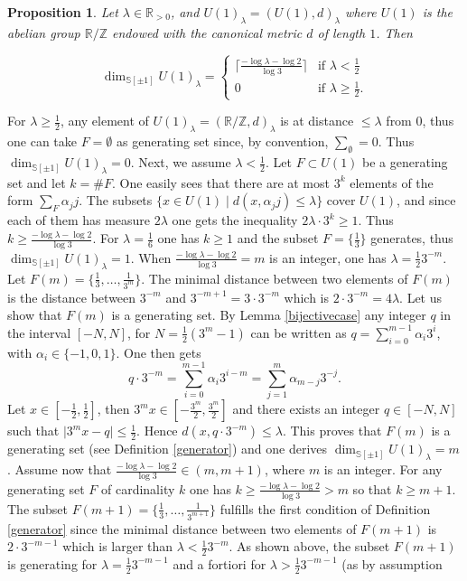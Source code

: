 \documentclass[cupthm]{CUP-JNL-JMJ}
\numberwithin{equation}{section}
\theoremstyle{cupplain}
\newtheorem{proposition}[theorem]{Proposition}
\theoremstyle{cupdefinition}
\theoremstyle{cupremark}
\theoremstyle{cupproof}
\def\R{{\mathbb R}}
\def\S{{\mathbb S}}
\def\Z{{\mathbb Z}}
\def\sss{{\S}}
\def\spm{{\sss[\pm 1]}}
\begin{document}
 
 \begin{proposition}\label{caseh1}
 Let $\lambda\in\R_{>0}$, and  $U(1)_\lambda=(U(1),d)_\lambda$ where $U(1)$ is the abelian group $\R/\Z$ endowed with the canonical metric $d$ of length $1$.	Then 
 
 \begin{equation}\label{dimh1}
\dim_{\spm}U(1)_\lambda=\begin{cases}\bigg\lceil \frac{-\log \lambda- \log 2}{\log 3}\bigg\rceil &\text{if $\lambda< \frac 12$}\\0 &\text{if $\lambda\geq \frac 12$.}	
\end{cases}
\end{equation}
 \end{proposition}
\proof For $\lambda\geq \frac 12$, any element of $U(1)_\lambda=(\R/\Z,d)_\lambda$ is at distance $\leq \lambda$ from $0$, thus one can take $F=\emptyset$ as generating set since, by convention, $\sum_\emptyset=0$. Thus $\dim_{\spm}U(1)_\lambda=0$. Next, we assume $\lambda<\frac 12$. Let $F\subset U(1)$ be a generating set and let $k=\# F$. One easily sees that there are at most $3^k$ elements of the form $\sum_F \alpha_j j$. The subsets  $\{x\in U(1) \mid d(x,\alpha_j j)\leq \lambda\}$  cover $U(1)$, and since each of them has measure $2\lambda$ one gets the inequality $2 \lambda\cdot  3^k\geq 1$. Thus  $k\geq \frac{-\log \lambda- \log 2}{\log 3}$. For $\lambda=\frac 16$ one has $k\geq 1$ and the subset  $F=\{\frac 13\}$ generates, thus $\dim_{\spm}U(1)_\lambda=1$.  When $\frac{-\log \lambda- \log 2}{\log 3}=m$ is an integer, one has $\lambda=\frac 12 3^{-m}$. Let $F(m)=\{\frac 13,\ldots,\frac{1}{3^{m}}\}$. The minimal distance between two elements of $F(m)$ is the distance between $3^{-m}$ and $3^{-m+1}= 3\cdot  3^{-m}$ which is $2 \cdot 3^{-m}=4 \lambda$.
Let us show that $F(m)$ is a generating set. By Lemma \ref{bijectivecase} any integer $q$ in the interval $[-N,N]$, for $N=\frac 12 (3^m-1)$ can be written as  $q=\sum_{i=0}^{m-1} \alpha_i 3^i$, with $\alpha_i\in\{-1,0,1\}$. One then gets 
\[
q \cdot 3^{-m}=\sum_{i=0}^{m-1} \alpha_i 3^{i-m}=\sum_{j=1}^{m}\alpha_{m-j}3^{-j}.
\]
 Let $x\in [-\frac 12,\frac 12]$, then $3^m  x\in [-\frac {3^m}{2},\frac {3^m}{2}]$ and there exists an integer $q\in [-N,N]$ such that $ \vert 3^m  x-q\vert \leq \frac 12$. 
 Hence $d(x,q \cdot 3^{-m})\leq \lambda$. This proves that $F(m)$ is a generating set (see Definition \ref{generator}) and one derives $\dim_{\spm}U(1)_\lambda=m$. Assume now that $\frac{-\log \lambda- \log 2}{\log 3}\in(m,m+1)$, where $m$ is an integer. For any generating set $F$ of cardinality $k$ one has $k\geq \frac{-\log \lambda- \log 2}{\log 3}>m$ so that $k\geq m+1$. The subset $F(m+1)=\{\frac 13,\ldots,\frac{1}{3^{m+1}}\}$ fulfills the first condition of Definition \ref{generator} since the minimal distance between two elements of  $F(m+1)$ is $2 \cdot 3^{-m-1}$ which is larger than $\lambda< \frac 12 3^{-m}$. As shown above, the subset $F(m+1)$ is generating for $\lambda=\frac 12 3^{-m-1}$ and a fortiori for $\lambda>\frac 12 3^{-m-1}$ (as by assumption  
\end{document}
